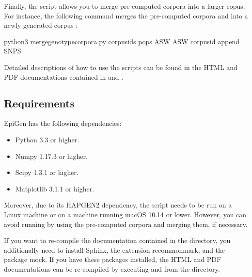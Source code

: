 \documentclass[a4paper,10pt,english]{sphinxhowto}
\begin{document}
Finally, the script  allows you to merge pre-computed corpora into a larger copus. For instance, the following command merges the pre-computed corpora  and  into a newly generated corpus :

\begin{sphinxVerbatim}[commandchars=\\\{\}]
python3 merge\PYGZus{}genotype\PYGZus{}corpora.py \PYGZhy{}\PYGZhy{}corpus\PYGZhy{}ids   \PYGZhy{}\PYGZhy{}pops ASW ASW \PYGZhy{}\PYGZhy{}corpus\PYGZhy{}id  \PYGZhy{}\PYGZhy{}append SNPS
\end{sphinxVerbatim}

Detailed descriptions of how to use the scripts can be found in the HTML and PDF documentations contained in  and .


\subsection{Requirements}
\label{\detokenize{README:requirements}}
EpiGen has the following dependencies:
\begin{itemize}
\item {} 
Python 3.3 or higher.

\item {} 
Numpy 1.17.3 or higher.

\item {} 
Scipy 1.3.1 or higher.

\item {} 
Matplotlib 3.1.1 or higher.

\end{itemize}

Moreover, due to its HAPGEN2 dependency, the script  needs to be run on a Linux machine or on a machine running macOS 10.14 or lower. However, you can avoid running  by using the pre-computed corpora and merging them, if necessary.

If you want to re-compile the documentation contained in the  directory, you additionally need to install Sphinx, the extension recommonmark, and the package mock. If you have these packages installed, the HTML and PDF documentations can be re-compiled by executing  and  from the  directory.
\end{document}
